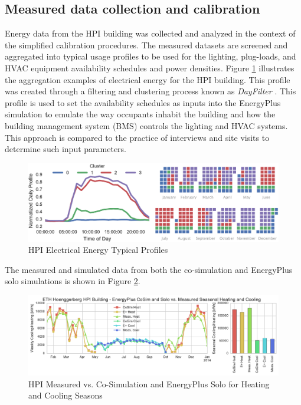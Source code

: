 \documentclass{tBPS2e}
\theoremstyle{plain}
\theoremstyle{definition}
\theoremstyle{remark}
\begin{document}

\subsection{Measured data collection and calibration}

Energy data from the HPI building was collected and analyzed in the context of the simplified calibration procedures. The measured datasets are screened and aggregated into typical usage profiles to be used for the lighting, plug-loads, and HVAC equipment availability schedules and power densities. Figure \ref{fig:hpi_elec_profiles} illustrates the aggregation examples of electrical energy for the HPI building. This profile was created through a filtering and clustering process known as \emph{DayFilter} \cite{Miller:2015kr}. This profile is used to set the availability schedules as inputs into the EnergyPlus simulation to emulate the way occupants inhabit the building and how the building management system (BMS) controls the lighting and HVAC systems. This approach is compared to the practice of interviews and site visits to determine such input parameters.

\begin{figure}[H]
\centering
\includegraphics[scale=0.6]{figures/HPI_combinedclusterandcal_4}
\caption{HPI Electrical Energy Typical Profiles}
\label{fig:hpi_elec_profiles}
\end{figure}

The measured and simulated data from both the co-simulation and EnergyPlus solo simulations is shown in Figure \ref{fig:hpi_measvssim}.

\begin{figure}[H]
\centering
\includegraphics[scale=0.55]{figures/HPI_MeasvsSim}
\caption{HPI Measured vs. Co-Simulation and EnergyPlus Solo for Heating and Cooling Seasons}
\label{fig:hpi_measvssim}
\end{figure}
\end{document}
